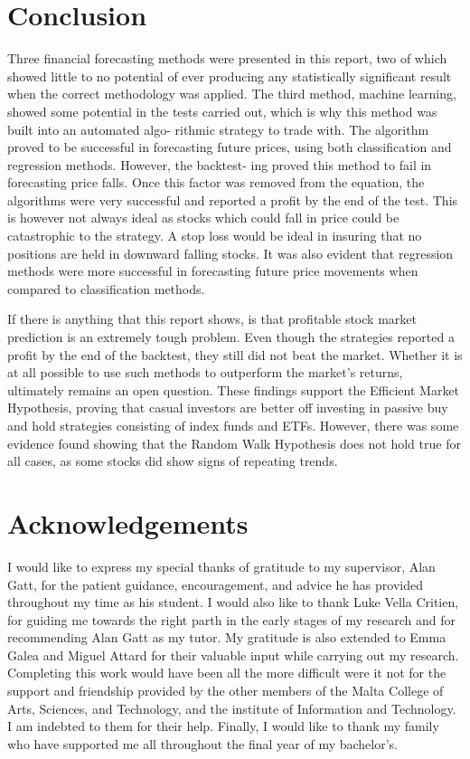 \documentclass[times]{jtitauth}
\begin{document}
\section{Conclusion}
Three financial forecasting methods were presented in this report, two of which showed little to no potential of ever producing any statistically significant result when the correct methodology was applied. The third method, machine learning, showed some potential in the tests carried out, which is why this method was built into an automated algo- rithmic strategy to trade with. The algorithm proved to be successful in forecasting future prices, using both classification and regression methods. However, the backtest- ing proved this method to fail in forecasting price falls. Once this factor was removed from the equation, the algorithms were very successful and reported a profit by the end of the test. This is however not always ideal as stocks which could fall in price could be catastrophic to the strategy. A stop loss would be ideal in insuring that no positions are held in downward falling stocks. It was also evident that regression methods were more successful in forecasting future price movements when compared to classification methods.

If there is anything that this report shows, is that profitable stock market prediction is an extremely tough problem. Even though the strategies reported a profit by the end of the backtest, they still did not beat the market. Whether it is at all possible to use such methods to outperform the market’s returns, ultimately remains an open question. These findings support the Efficient Market Hypothesis, proving that casual investors are better off investing in passive buy and hold strategies consisting of index funds and ETFs. However, there was some evidence found showing that the Random Walk Hypothesis does not hold true for all cases, as some stocks did show signs of repeating trends.

\section*{Acknowledgements}

I would like to express my special thanks of gratitude to my supervisor, Alan Gatt, for the patient guidance, encouragement, and advice he has provided throughout my time as his student. I would also like to thank Luke Vella Critien, for guiding me towards the right parth in the early stages of my research and for recommending Alan Gatt as my tutor. My gratitude is also extended to Emma Galea and Miguel Attard for their valuable input while carrying out my research. Completing this work would have been all the more difficult were it not for the support and friendship provided by the other members of the Malta College of Arts, Sciences, and Technology, and the institute of Information and Technology. I am indebted to them for their help. Finally, I would like to thank my family who have supported me all throughout the final year of my bachelor’s.
\end{document}
